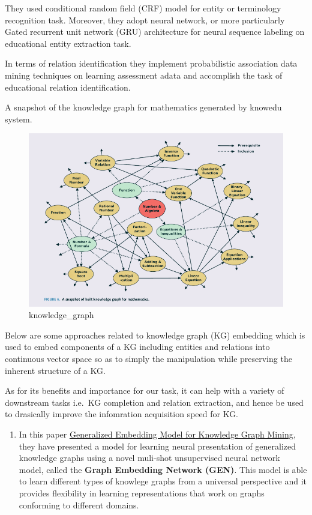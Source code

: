 \documentclass[]{book}
\providecommand{\tightlist}{%
  \setlength{\itemsep}{0pt}\setlength{\parskip}{0pt}}
\theoremstyle{definition}
\theoremstyle{definition}
\theoremstyle{definition}
\theoremstyle{remark}
\begin{document}
They used conditional random field (CRF) model for entity or terminology
recognition task. Moreover, they adopt neural network, or more
particularly Gated recurrent unit network (GRU) architecture for neural
sequence labeling on educational entity extraction task.

In terms of relation identification they implement probabilistic
association data mining techniques on learning assessment adata and
accomplish the task of educational relation identification.

A snapshot of the knowledge graph for mathematics generated by knowedu
system.

\begin{figure}
\centering
\includegraphics{img/kg.png}
\caption{knowledge\_graph}
\end{figure}

Below are some approaches related to knowledge graph (KG) embedding
which is used to embed components of a KG including entities and
relations into continuous vector space so as to simply the manipulation
while preserving the inherent structure of a KG.

As for its benefits and importance for our task, it can help with a
variety of downstream tasks i.e.~KG completion and relation extraction,
and hence be used to drasically improve the infomration acquisition
speed for KG.

\begin{enumerate}
\def\labelenumi{\arabic{enumi}.}
\setcounter{enumi}{1}
\tightlist
\item
  In this paper
  \href{http://www.mlgworkshop.org/2018/papers/MLG2018_paper_5.pdf}{Generalized
  Embedding Model for Knowledge Graph Mining}, they have presented a
  model for learning neural presentation of generalized knowledge graphs
  using a novel muli-shot unsupervised neural network model, called the
  \textbf{Graph Embedding Network (GEN)}. This model is able to learn
  different types of knowlege graphs from a universal perspective and it
  provides flexibility in learning representations that work on graphs
  conforming to different domains.
\end{enumerate}
\end{document}
